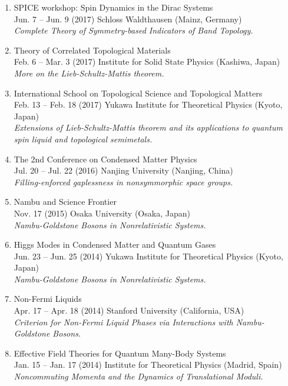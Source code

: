 \documentclass[letterpaper,11pt]{article}
\begin{document}
\begin{enumerate}
\item
SPICE workshop: Spin Dynamics in the Dirac Systems\\
Jun. 7 -- Jun. 9 (2017) Schloss Waldthausen (Mainz, Germany)\\
\emph{Complete Theory of Symmetry-based Indicators of Band Topology.}

\item
Theory of Correlated Topological Materials\\
Feb. 6 -- Mar. 3 (2017) Institute for Solid State Physics (Kashiwa, Japan)\\
\emph{More on the Lieb-Schultz-Mattis theorem.}

\item
International School on Topological Science and Topological Matters\\
Feb. 13 -- Feb. 18 (2017) Yukawa Institute for Theoretical Physics (Kyoto, Japan)\\
\emph{Extensions of Lieb-Schultz-Mattis theorem and its applications to quantum spin liquid and topological semimetals.}

\item
The 2nd Conference on Condensed Matter Physics\\
Jul. 20 -- Jul. 22 (2016) Nanjing University (Nanjing, China)\\
\emph{Filling-enforced gaplessness in nonsymmorphic space groups.}

\item
Nambu and Science Frontier\\
Nov. 17 (2015) Osaka University (Osaka, Japan)\\
\emph{Nambu-Goldstone Bosons in Nonrelativistic Systems.}

\item
Higgs Modes in Condensed Matter and Quantum Gases\\
Jun. 23 -- Jun. 25 (2014) Yukawa Institute for Theoretical Physics (Kyoto, Japan)\\
\emph{Nambu-Goldstone Bosons in Nonrelativistic Systems.}

\item
Non-Fermi Liquids\\
Apr. 17 -- Apr. 18 (2014) Stanford University (California, USA)\\
\emph{Criterion for Non-Fermi Liquid Phases via Interactions with Nambu-Goldstone Bosons.}

\item
Effective Field Theories for Quantum Many-Body Systems\\
Jan. 15 -- Jan. 17 (2014) Institute for Theoretical Physics (Madrid, Spain)\\
\emph{Noncommuting Momenta and the Dynamics of Translational Moduli.}


\end{enumerate}
\end{document}
